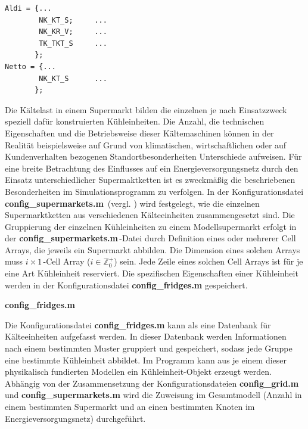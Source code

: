 \begin{lstlisting}[float=h!,caption=config\_supermarkets.m,label={csuper}]
%%       Kind of fridge
Aldi = {...
        NK_KT_S;     ...
        NK_KR_V;     ...
        TK_TKT_S     ...
       };
Netto = {...
        NK_KT_S      ...
       };
\end{lstlisting}

Die Kältelast in einem Supermarkt bilden die einzelnen je nach Einsatzzweck
speziell dafür konstruierten Kühleinheiten. Die Anzahl, die technischen
Eigenschaften und die Betriebsweise dieser Kältemaschinen können in der Realität
beispielsweise auf Grund von klimatischen, wirtschaftlichen oder auf
Kundenverhalten bezogenen Standortbesonderheiten Unterschiede
aufweisen. Für eine breite Betrachtung des
Einflusses auf ein Energieversorgungsnetz durch den Einsatz unterschiedlicher
Supermaktketten ist es zweckmäßig die beschriebenen Besonderheiten im
Simulationsprogramm zu verfolgen. In der Konfigurationsdatei
\textbf{config\_supermarkets.m$\,$} (vergl. ) wird festgelegt,
wie die einzelnen Supermarktketten aus verschiedenen Kälteeinheiten
zusammengesetzt sind. Die Gruppierung der einzelnen Kühleinheiten zu einem
Modellsupermarkt erfolgt in der \textbf{config\_supermarkets.m$\,$}-Datei durch
Definition eines oder mehrerer Cell Arrays, die jeweils ein Supermarkt abbilden.
Die Dimension eines solchen Arrays muss $i\times1\,$-Cell Array ($i\in
\mathbb{Z}^+_0$) sein. Jede Zeile eines solchen Cell Arrays ist für je eine
Art Kühleinheit reserviert. Die spezifischen Eigenschaften einer Kühleinheit
werden in der Konfigurationsdatei \textbf{config\_fridges.m} gespeichert.

\vspace{3mm}%
\noindent\textbf{config\_fridges.m}
\vspace{3mm}

Die Konfigurationsdatei \textbf{config\_fridges.m} kann als eine Datenbank für
Kälteeinheiten aufgefasst werden. In dieser Datenbank werden Informationen nach
einem bestimmten Muster gruppiert und gespeichert, sodass jede Gruppe eine
bestimmte Kühleinheit abbildet. Im Programm kann aus
je einem dieser physikalisch fundierten Modellen ein Kühleinheit-Objekt
erzeugt werden. Abhängig von der Zusammensetzung der Konfigurationsdateien
\textbf{config\_grid.m} und \textbf{config\_supermarkets.m} wird die Zuweisung
im Gesamtmodell (Anzahl in einem bestimmten Supermarkt und an einen bestimmten
Knoten im Energieversorgungsnetz) durchgeführt.

